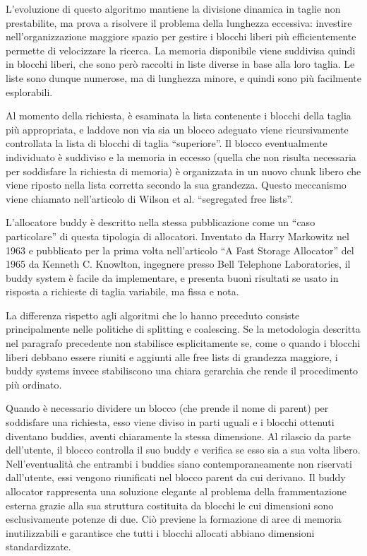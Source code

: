L’evoluzione di questo algoritmo mantiene la divisione dinamica in taglie non prestabilite, ma prova a risolvere il problema della lunghezza eccessiva: investire nell’organizzazione maggiore spazio per gestire i blocchi liberi più efficientemente permette di velocizzare la ricerca. La memoria disponibile viene suddivisa quindi in blocchi liberi, che sono però raccolti in liste diverse in base alla loro taglia. Le liste sono dunque numerose, ma di lunghezza minore, e quindi sono più facilmente esplorabili.

Al momento della richiesta, è esaminata la lista contenente i blocchi della taglia più appropriata, e laddove non via sia un blocco adeguato viene ricursivamente controllata la lista di blocchi di taglia “superiore”. Il blocco eventualmente individuato è suddiviso e la memoria in eccesso (quella che non risulta necessaria per soddisfare la richiesta di memoria) è organizzata in un nuovo chunk libero che viene riposto nella lista corretta secondo la sua grandezza. Questo meccanismo viene chiamato nell’articolo di Wilson et al. “segregated free lists”.

L’allocatore buddy è descritto nella stessa pubblicazione come un “caso particolare” di questa tipologia di allocatori. Inventato da Harry Markowitz nel 1963 e pubblicato per la prima volta nell’articolo “A Fast Storage Allocator” del 1965 da Kenneth C. Knowlton, ingegnere presso Bell Telephone Laboratories, il buddy system è facile da implementare, e presenta buoni risultati se usato in risposta a richieste di taglia variabile, ma fissa e nota.
 
La differenza rispetto agli algoritmi che lo hanno preceduto consiste principalmente nelle politiche di splitting e coalescing. Se la metodologia descritta nel paragrafo precedente non stabilisce esplicitamente se, come o quando i blocchi liberi debbano essere riuniti e aggiunti alle free lists di grandezza maggiore, i buddy systems invece stabiliscono una chiara gerarchia che rende il procedimento più ordinato.

Quando è necessario dividere un blocco (che prende il nome di parent) per soddisfare una richiesta, esso viene diviso in parti uguali e i blocchi ottenuti diventano buddies, aventi chiaramente la stessa dimensione. Al rilascio da parte dell’utente, il blocco controlla il suo buddy e verifica se esso sia a sua volta libero. Nell’eventualità che entrambi i buddies siano contemporaneamente non riservati dall’utente, essi vengono riunificati nel blocco parent da cui derivano. Il buddy allocator rappresenta una soluzione elegante al problema della frammentazione esterna grazie alla sua struttura costituita da blocchi le cui dimensioni sono esclusivamente potenze di due. Ciò previene la formazione di aree di memoria inutilizzabili e garantisce che tutti i blocchi allocati abbiano dimensioni standardizzate.

